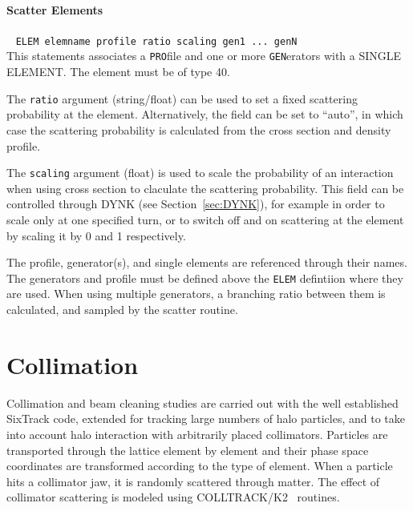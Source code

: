 \paragraph{Scatter Elements}~ \texttt{ELEM elemname profile ratio scaling gen1 ... genN}\\

This statements associates a \texttt{PRO}file and one or more \texttt{GEN}erators with a SINGLE ELEMENT.
The element must be of type 40.

The \texttt{ratio} argument (string/float) can be used to set a fixed scattering probability at the element.
Alternatively, the field can be set to ``auto'', in which case the scattering probability is calculated from the cross section and density profile.

The \texttt{scaling} argument (float) is used to scale the probability of an interaction when using cross section to claculate the scattering probability.
This field can be controlled through DYNK (see Section~\ref{sec:DYNK}), for example in order to scale only at one specified turn, or to switch off and on scattering at the element by scaling it by 0 and 1 respectively.

The profile, generator(s), and single elements are referenced through their names.
The generators and profile must be defined above the \texttt{ELEM} defintiion where they are used.
When using multiple generators, a branching ratio between them is calculated, and sampled by the scatter routine.

\section{Collimation} \label{sec:collimat}

Collimation and beam cleaning studies are carried out with the well established SixTrack code, extended for tracking large numbers of halo particles, and to take into account halo interaction with arbitrarily placed collimators.
Particles are transported through the lattice element by element and their phase space coordinates are transformed according to the type of element. When a particle hits a collimator jaw, it is randomly scattered through matter.
The effect of collimator scattering is modeled using COLLTRACK/K2~\cite{collimat:trenkler,collimat:robert_demolaize} routines.

